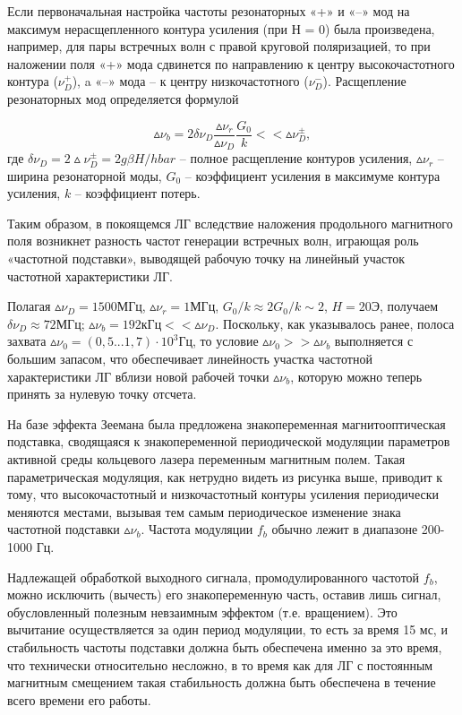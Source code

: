 \documentclass[a4paper,12pt]{article} %
\begin{document}
Если первоначальная настройка частоты резонаторных «+» и «–» мод на
максимум нерасщепленного контура усиления (при Н = 0) была произведена,
например, для пары встречных волн с правой круговой поляризацией, то при
наложении поля «+» мода сдвинется по направлению к центру высокочастотного контура ($\nu^+_D$), a «–» мода – к центру низкочастотного ($\nu^-_D$). Расщепление резонаторных мод определяется формулой

\begin{equation}
    \vartriangle \! \! \nu_b = 2 \delta \nu_D \frac{\vartriangle \!\! \nu_r}
    {\vartriangle \!\! \nu_D} \frac {G_0} {k} << \vartriangle \!\! \nu^\pm_D,
\end{equation}
где $\delta \nu_D = 2 \!\! \vartriangle \!\! \nu^\pm_D = 2g \beta H / hbar$ -- полное расщепление контуров усиления, $\vartriangle \!\! \nu_r$ -- ширина резонаторной моды, $G_0$ -- коэффициент усиления в максимуме контура усиления, $k$ – коэффициент потерь.

Таким образом, в покоящемся ЛГ вследствие наложения продольного магнитного поля возникнет разность частот генерации встречных волн, играющая
роль «частотной подставки», выводящей рабочую точку на линейный участок
частотной характеристики ЛГ.

Полагая $\vartriangle \!\! \nu_D = 1500 \text{МГц}$, $\vartriangle \!\! \nu_r = 1$МГц, $G_0 / k \approx 2G_0 / k \sim 2$, $H = 20$Э, получаем $\delta \nu_D \approx 72$МГц; $\vartriangle \!\! \nu_b = 192$кГц$ << \vartriangle \!\! \nu_D$. Поскольку, как указывалось ранее, полоса захвата $\vartriangle \!\! \nu_0 = (0,5...1,7) \cdot 10^3$Гц, то условие $\vartriangle \!\! \nu_0 >> \vartriangle \!\! \nu_b$ выполняется с большим запасом, что обеспечивает линейность участка частотной характеристики ЛГ вблизи новой рабочей точки $\vartriangle \!\! \nu_b$, которую можно теперь принять за нулевую точку отсчета.

На базе эффекта Зеемана была предложена знакопеременная магнитооптическая подставка, сводящаяся к знакопеременной периодической модуляции
параметров активной среды кольцевого лазера переменным магнитным полем.
Такая параметрическая модуляция, как нетрудно видеть из рисунка выше, приводит к
тому, что высокочастотный и низкочастотный контуры усиления периодически
меняются местами, вызывая тем самым периодическое изменение знака частотной подставки $\vartriangle \!\! \nu_b$. Частота модуляции $f_b$ обычно лежит в диапазоне 200-1000 Гц.

Надлежащей обработкой выходного сигнала, промодулированного частотой $f_b$, можно исключить (вычесть) его знакопеременную часть, оставив лишь
сигнал, обусловленный полезным невзаимным эффектом (т.е. вращением). Это
вычитание осуществляется за один период модуляции, то есть за время 15 мс, и
стабильность частоты подставки должна быть обеспечена именно за это время,
что технически относительно несложно, в то время как для ЛГ с постоянным
магнитным смещением такая стабильность должна быть обеспечена в течение
всего времени его работы.
\end{document}
